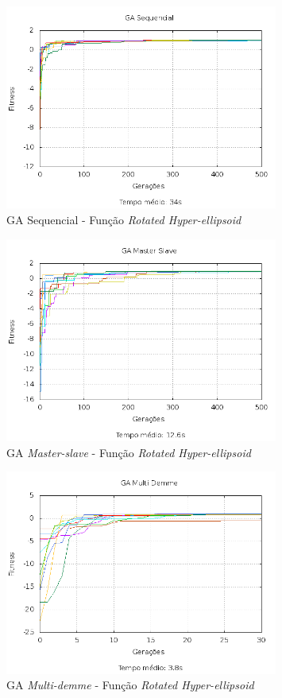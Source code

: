 \documentclass[12pt]{article}
\begin{document}
\begin{figure}[hp]
  \centering
  \includegraphics[width=0.8\textwidth]{seq_f2.png}
  \caption{GA Sequencial - Função \emph{Rotated Hyper-ellipsoid}}
\end{figure}

\begin{figure}[hp]
  \centering
  \includegraphics[width=0.8\textwidth]{ms_f2.png}
  \caption{GA \emph{Master-slave} - Função \emph{Rotated Hyper-ellipsoid}}
\end{figure}

\begin{figure}[hp]
  \centering
  \includegraphics[width=0.8\textwidth]{md_f2.png}
  \caption{GA \emph{Multi-demme} - Função \emph{Rotated Hyper-ellipsoid}}
\end{figure}
\end{document}
